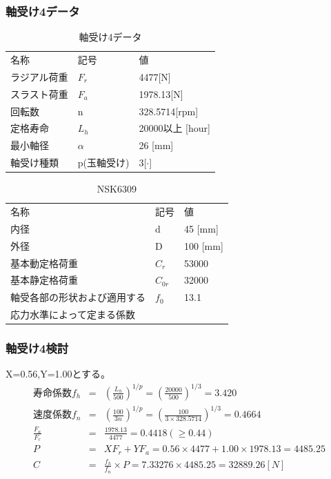 \documentclass[a4j,twoside,openright,11pt]{jreport}
\begin{document}
\subsubsection{軸受け4データ}
\begin{table}[htb]
\begin{center}
  \caption{軸受け4データ}
  \begin{tabular}{lll} \hline
名称&記号&値\\
ラジアル荷重&$F_r$&4477[N]\\
スラスト荷重&$F_a$&1978.13[N]\\
回転数&n&328.5714[rpm]\\
定格寿命&$L_h$&20000以上 [hour]\\
最小軸径&$\alpha$&26 [mm]\\
軸受け種類&p(玉軸受け)&3[$\cdot$]\\
\hline
  \end{tabular}
\end{center}
\end{table}

\begin{table}[htb]
\begin{center}
  \caption{NSK6309}
  \begin{tabular}{lll} \hline
名称&記号&値\\
内径& d &45 [mm]\\
外径& D &100 [mm]\\
基本動定格荷重&$C_{r}$&53000\\
基本静定格荷重&$C_{0r}$&32000\\
軸受各部の形状および適用する&$f_0$&13.1\\
応力水準によって定まる係数&&\\
\hline
  \end{tabular}
\end{center}
\end{table}

\subsubsection{軸受け4検討}
X=0.56,Y=1.00とする。
\begin{eqnarray}
寿命係数f_h &=& \left( \frac{L_h}{500} \right)^{1/p} = \left( \frac{20000}{500} \right)^{1/3} = 3.420\\
速度係数f_n &=& \left( \frac{100}{3n} \right)^{1/p} = \left( \frac{100}{3 \times 328.5714} \right)^{1/3} = 0.4664\\
\frac{F_a}{F_r} &=& \frac{1978.13}{4477} = 0.4418(\geq 0.44)\\
P &=& XF_r+YF_a = 0.56 \times 4477 + 1.00 \times 1978.13 = 4485.25\\
C &=& \frac{f_h}{f_n} \times P = 7.33276 \times 4485.25 = 32889.26[N]
\end{eqnarray}
\end{document}
